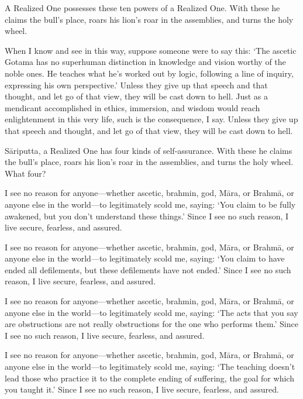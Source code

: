 \documentclass[12pt,openany]{book}%
\begin{document}
A Realized One possesses these ten powers of a Realized One. With these he claims the bull’s place, roars his lion’s roar in the assemblies, and turns the holy wheel. 

When I know and see in this way, suppose someone were to say this: ‘The ascetic Gotama has no superhuman distinction in knowledge and vision worthy of the noble ones. He teaches what he’s worked out by logic, following a line of inquiry, expressing his own perspective.’ Unless they give up that speech and that thought, and let go of that view, they will be cast down to hell. Just as a mendicant accomplished in ethics, immersion, and wisdom would reach enlightenment in this very life, such is the consequence, I say. Unless they give up that speech and thought, and let go of that view, they will be cast down to hell. 

\textsanskrit{Sāriputta}, a Realized One has four kinds of self-assurance. With these he claims the bull’s place, roars his lion’s roar in the assemblies, and turns the holy wheel. What four? 

I see no reason for anyone—whether ascetic, brahmin, god, \textsanskrit{Māra}, or \textsanskrit{Brahmā}, or anyone else in the world—to legitimately scold me, saying: ‘You claim to be fully awakened, but you don’t understand these things.’ Since I see no such reason, I live secure, fearless, and assured. 

I see no reason for anyone—whether ascetic, brahmin, god, \textsanskrit{Māra}, or \textsanskrit{Brahmā}, or anyone else in the world—to legitimately scold me, saying: ‘You claim to have ended all defilements, but these defilements have not ended.’ Since I see no such reason, I live secure, fearless, and assured. 

I see no reason for anyone—whether ascetic, brahmin, god, \textsanskrit{Māra}, or \textsanskrit{Brahmā}, or anyone else in the world—to legitimately scold me, saying: ‘The acts that you say are obstructions are not really obstructions for the one who performs them.’ Since I see no such reason, I live secure, fearless, and assured. 

I see no reason for anyone—whether ascetic, brahmin, god, \textsanskrit{Māra}, or \textsanskrit{Brahmā}, or anyone else in the world—to legitimately scold me, saying: ‘The teaching doesn’t lead those who practice it to the complete ending of suffering, the goal for which you taught it.’ Since I see no such reason, I live secure, fearless, and assured. 
\end{document}
